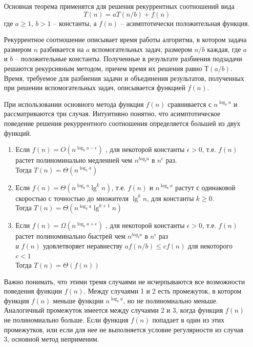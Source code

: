\documentclass[a4paper,11pt]{article}
\begin{document}
Основная теорема применятся для решения рекуррентных соотношений вида
\begin{equation*}
  T(n) = aT(n/b) + f(n)
\end{equation*}
где $a \geqslant 1$, $b > 1$ -- константы, а $f(n)$ -- асимптотически
положительная функция.

Рекуррентное соотношение описывает время работы алгоритма, в котором задача
размером $n$ разбивается на $a$ вспомогательных задач, размером $n/b$ каждая,
где $a$ и $b$ -- положительные константы. Полученные в результате разбиения
подзадачи решаются рекурсивным методом, причем время их решения равно $Т(a/b)$.
Время, требуемое для разбиения задачи и объединения результатов, полученных при
решении вспомогательных задач, описывается функцией $f(n)$.

При использовании основного метода функция $f(n)$ сравнивается с
$n^{\log_b a}$ и рассматриваются три случая. Интуитивно понятно, что
асимптотическое поведение решения рекуррентного соотношения определяется
большей из двух функций.

\begin{enumerate}
\item Если $f(n) = O(n^{\log_{b}{a - \epsilon}})$ , для некоторой константы
  $\epsilon > 0$, т.е. $f(n)$ растет полиноминально медленней чем $n^{log_b a}$
  в $n^\epsilon$ раз.\\Тогда $T(n) = \Theta(n^{\log_b a})$
\item Если $f(n) = \Theta(n^{\log_b a}\lg^k n)$, т.е. $f(n)$ и $n^{\log_b a}$
  растут с одинаковой скоростью с точностью до множителя $\lg^k n$, для
  константы $k \geqslant 0$.\\ Тогда $T(n) = \Theta(n^{\log_b a}\lg^{k+1} n)$
\item Если $f(n) = \Omega(n^{\log_{b}{a + \epsilon}})$ , для некоторой
  константы $\epsilon > 0$, т.е. $f(n)$ растет полиноминально быстрей чем
  $n^{log_b a}$ в $n^\epsilon$ раз \\
  \emph{и} $f(n)$ удовлетворяет неравнеству $a f(n/b) \leqslant c f(n)$ для
  некоторого $c < 1$\\Тогда $T(n) = \Theta(f(n))$
\end{enumerate}

Важно понимать, что этими тремя случаями не исчерпываются все возможности
поведения функции $f(n)$. Между случаями 1 и 2 есть промежуток, в котором 
функция $f(n)$ меньше функции $n^{\log_b a}$, но не полиномиально меньше.
Аналогичный промежуток имеется между случаями 2 и 3, когда функция $f(n)$ не
полиномиально больше. Если функция $f(n)$ попадает в один из этих промежутков,
или если для нее не выполняется условие регулярности из случая 3, основной
метод неприменим.
\end{document}
